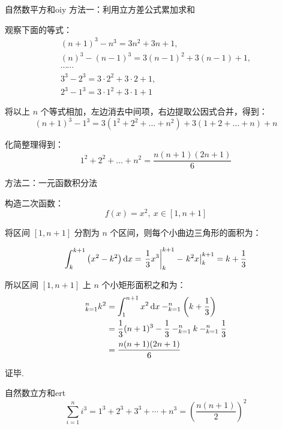 \documentclass[12pt, cn]{elegantart}
\begin{document}
\begin{definition}{自然数平方和}{oiy}
 方法一：利用立方差公式累加求和

观察下面的等式：
$$\begin{array}{l}
{(n+1)^{3}-n^{3}=3 n^{2}+3 n+1}, \\ {(n)^{3}-(n-1)^{3}=3(n-1)^{2}+3(n-1)+1}, \\ {\cdots \cdots} \\ {3^{3}-2^{3}=3 \cdot 2^{2}+3 \cdot 2+1}, \\ {2^{3}-1^{3}=3 \cdot 1^{2}+3 \cdot 1+1}
\end{array}$$

将以上 $n$ 个等式相加，左边消去中间项，右边提取公因式合并，得到：
$$
(n+1)^{3}-1^{3}=3\left(1^{2}+2^{2}+\dots+n^{2}\right)+3(1+2+\dots+n)+n
$$

化简整理得到：
$$
1^{2}+2^{2}+\dots+n^{2}=\frac{n(n+1)(2 n+1)}{6}
$$

\hdashrule{\linewidth}{0.5pt}{3pt}

 方法二：一元函数积分法

构造二次函数：
$$f(x)=x^2,\ x \in[1, n+1]$$

将区间 $[1, n+1]$ 分割为 $n$ 个区间，则每个小曲边三角形的面积为：

$$
\int_{k}^{k+1}\left(x^{2}-k^{2}\right) \mathop{}\!\mathrm{d} x=\left.\frac{1}{3} x^{3}\right|_{k} ^{k+1}-\left.k^{2} x\right|_{k} ^{k+1}=k+\frac{1}{3}
$$

所以区间 $[1, n+1]$ 上 $n$ 个小矩形面积之和为：
\begin{align*}
   \relax_{k=1}^{n} k^{2}&=\int_{1}^{n+1} x^{2} \mathop{}\!\mathrm{d} x-\relax_{k=1}^{n}\left(k+\frac{1}{3}\right)\\
   &=\frac{1}{3}(n+1)^{3}-\frac{1}{3}-\relax_{k=1}^{n} k-\relax_{k=1}^{n} \frac{1}{3}\\
   &=\frac{n(n+1)(2 n+1)}{6}
   \end{align*}

   证毕.

\end{definition}


\begin{theorem}{自然数立方和}{ert}
\begin{equation}
     \sum_{i=1}^{n} i^{3}=1^3+2^3+3^3+\cdots+n^3=\left(\frac{n(n+1)}{2}\right)^{2}
\end{equation}
\end{theorem}
\end{document}
